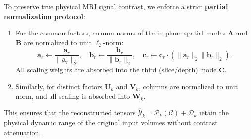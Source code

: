 \documentclass[11pt,a4paper]{article}
\begin{document}
To preserve true physical MRI signal contrast, we enforce a strict \textbf{partial normalization protocol}:
\begin{enumerate}
    \item For the common factors, column norms of the in-plane spatial modes $\mathbf{A}$ and $\mathbf{B}$ are normalized to unit $\ell_2$-norm:
    \begin{equation}
    \mathbf{a}_r \leftarrow \frac{\mathbf{a}_r}{\|\mathbf{a}_r\|_2}, \quad \mathbf{b}_r \leftarrow \frac{\mathbf{b}_r}{\|\mathbf{b}_r\|_2}, \quad \mathbf{c}_r \leftarrow \mathbf{c}_r \cdot (\|\mathbf{a}_r\|_2 \|\mathbf{b}_r\|_2).
    \end{equation}
    All scaling weights are absorbed into the third (slice/depth) mode $\mathbf{C}$.
    \item Similarly, for distinct factors $\mathbf{U}_k$ and $\mathbf{V}_k$, columns are normalized to unit norm, and all scaling is absorbed into $\mathbf{W}_k$.
\end{enumerate}
This ensures that the reconstructed tensors $\hat{\bm{\mathcal{Y}}}_k = \bm{\mathcal{P}}_k(\bm{\mathcal{C}}) + \bm{\mathcal{D}}_k$ retain the physical dynamic range of the original input volumes without contrast attenuation.
\end{document}
